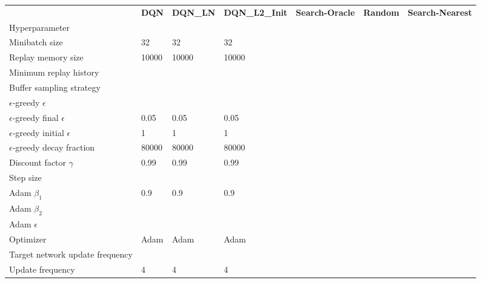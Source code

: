 \begin{tabular}{lllllll}
 & \bfseries DQN & \bfseries DQN_LN & \bfseries DQN_L2_Init & \bfseries Search-Oracle & \bfseries Random & \bfseries Search-Nearest \\
Hyperparameter &  &  &  &  &  &  \\
Minibatch size & 32 & 32 & 32 &  &  &  \\
Replay memory size & 10000 & 10000 & 10000 &  &  &  \\
Minimum replay history &  &  &  &  &  &  \\
Buffer sampling strategy &  &  &  &  &  &  \\
$\epsilon$-greedy $\epsilon$ &  &  &  &  &  &  \\
$\epsilon$-greedy final $\epsilon$ & 0.05 & 0.05 & 0.05 &  &  &  \\
$\epsilon$-greedy initial $\epsilon$ & 1 & 1 & 1 &  &  &  \\
$\epsilon$-greedy decay fraction & 80000 & 80000 & 80000 &  &  &  \\
Discount factor $\gamma$ & 0.99 & 0.99 & 0.99 &  &  &  \\
Step size &  &  &  &  &  &  \\
Adam $\beta_1$ & 0.9 & 0.9 & 0.9 &  &  &  \\
Adam $\beta_2$ &  &  &  &  &  &  \\
Adam $\epsilon$ &  &  &  &  &  &  \\
Optimizer & Adam & Adam & Adam &  &  &  \\
Target network update frequency &  &  &  &  &  &  \\
Update frequency & 4 & 4 & 4 &  &  &  \\
\end{tabular}
